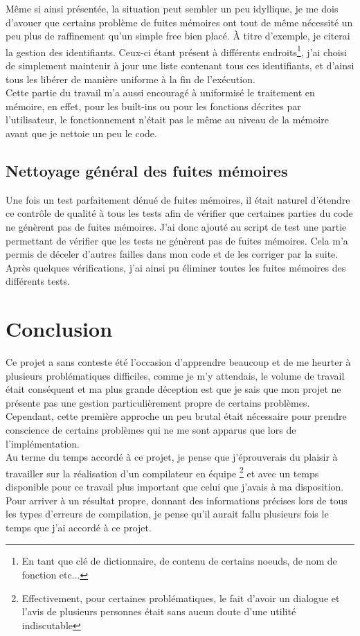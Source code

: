\documentclass[12pt]{article}
\begin{document}
Même si ainsi présentée, la situation peut sembler un peu idyllique, je me
dois d'avouer que certains problème de fuites mémoires ont tout de même
nécessité un peu plus de raffinement qu'un simple free bien placé. À titre
d'exemple, je citerai la gestion des identifiants. Ceux-ci étant présent à
différents endroits\footnote{En tant que clé de dictionnaire, de contenu de
certains noeuds, de nom de fonction etc...}, j'ai choisi de simplement
maintenir à jour une liste contenant tous ces identifiants, et d'ainsi tous
les libérer de manière uniforme à la fin de l'exécution.\\

Cette partie du travail m'a aussi encouragé à uniformisé le traitement en
mémoire, en effet, pour les built-ins ou pour les fonctions décrites par
l'utilisateur, le fonctionnement n'était pas le même au niveau de la mémoire
avant que je nettoie un peu le code.

\subsection{Nettoyage général des fuites mémoires}
Une fois un test parfaitement dénué de fuites mémoires, il était naturel
d'étendre ce contrôle de qualité à tous les tests afin de vérifier que
certaines parties du code ne génèrent pas de fuites mémoires. J'ai donc
ajouté au script de test une partie permettant de vérifier que les tests ne
génèrent pas de fuites mémoires. Cela m'a permis de déceler d'autres failles
dans mon code et de les corriger par la suite. Après quelques vérifications,
j'ai ainsi pu éliminer toutes les fuites mémoires des différents tests.

\section{Conclusion}
Ce projet a sans conteste été l'occasion d'apprendre beaucoup et de me
heurter à plusieurs problématiques difficiles, comme je m'y attendais, le
volume de travail était conséquent et ma plus grande déception est que je
sais que mon projet ne présente pas une gestion particulièrement propre de
certains problèmes. Cependant, cette première approche un peu brutal était
nécessaire pour prendre conscience de certains problèmes qui ne me sont
apparus que lors de l'implémentation.\\

Au terme du temps accordé à ce projet, je pense que j'éprouverais du plaisir
à travailler sur la réalisation d'un compilateur en équipe
\footnote{Effectivement, pour certaines problématiques, le fait d'avoir un
dialogue et l'avis de plusieurs personnes était sans aucun doute d'une
utilité indiscutable} et avec un temps disponible pour ce travail plus
important que celui que j'avais à ma disposition. Pour arriver à un résultat
propre, donnant des informations précises lors de tous les types d'erreurs
de compilation, je pense qu'il aurait fallu plusieurs fois le temps que j'ai
accordé à ce projet.\\
\end{document}
